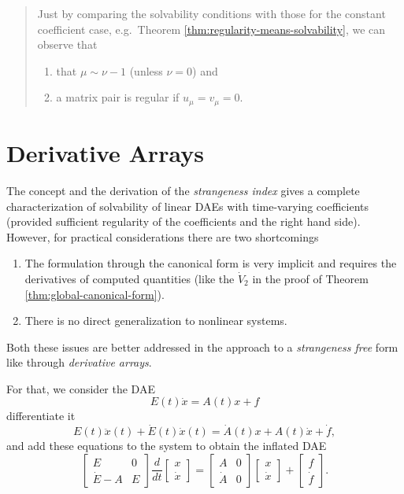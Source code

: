 \documentclass[]{book}
\providecommand{\tightlist}{%
  \setlength{\itemsep}{0pt}\setlength{\parskip}{0pt}}
\newenvironment {JHSAYS} [0] {\begin{quote}\color{jhsc}} {\end{quote}}
\theoremstyle{definition}
\theoremstyle{definition}
\theoremstyle{definition}
\theoremstyle{definition}
\theoremstyle{remark}
\begin{document}
\begin{JHSAYS}
Just by comparing the solvability conditions with those for the constant coefficient case, e.g.~Theorem \ref{thm:regularity-means-solvability}, we can observe that

\begin{enumerate}
\def\labelenumi{\arabic{enumi}.}
\tightlist
\item
  that \(\mu \sim \nu -1\) (unless \(\nu =0\)) and
\item
  a matrix pair is regular if \(u_\mu = v_\mu = 0\).
\end{enumerate}
\end{JHSAYS}

\hypertarget{derivative-arrays}{%
\section{Derivative Arrays}\label{derivative-arrays}}

The concept and the derivation of the \emph{strangeness index} gives a complete characterization of solvability of linear DAEs with time-varying coefficients (provided sufficient regularity of the coefficients and the right hand side). However, for practical considerations there are two shortcomings

\begin{enumerate}
\def\labelenumi{\arabic{enumi}.}
\item
  The formulation through the canonical form is very implicit and requires the derivatives of computed quantities (like the \(\dot V_2\) in the proof of Theorem \ref{thm:global-canonical-form}).
\item
  There is no direct generalization to nonlinear systems.
\end{enumerate}

Both these issues are better addressed in the approach to a \emph{strangeness free} form like through \emph{derivative arrays}.

For that, we consider the DAE
\[
E(t) \dot x = A(t) x+f
\]
differentiate it
\[
E(t) \ddot x(t) + \dot E(t) \dot x(t) = \dot A(t) x + A(t) \dot x+\dot f,
\]
and add these equations to the system to obtain the inflated DAE
\[
\begin{bmatrix}
E & 0\\
\dot E - A & E 
\end{bmatrix}
\frac{d}{dt}
\begin{bmatrix}
x \\ \dot x
\end{bmatrix} =
\begin{bmatrix}
A & 0\\
\dot A & 0 
\end{bmatrix}
\begin{bmatrix}
x \\ \dot x
\end{bmatrix}
+
\begin{bmatrix}
f \\ \dot f
\end{bmatrix}.
\]
\end{document}
